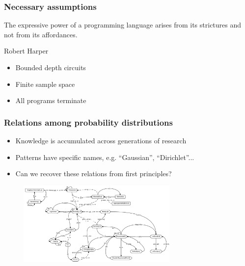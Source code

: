 \documentclass{beamer}
\begin{document}
  \begin{frame}
    \frametitle{Necessary assumptions}
    \setlength{\epigraphwidth}{0.5\textwidth}
    \epigraph{The expressive power of a programming language arises from its strictures and not from its affordances.}{Robert Harper}
    \begin{itemize}
      \item Bounded depth circuits
      \item Finite sample space
      \item All programs terminate
    \end{itemize}
  \end{frame}

  \begin{frame}
    \frametitle{Relations among probability distributions}
    \begin{itemize}
      \item Knowledge is accumulated across generations of research
      \item Patterns have specific names, e.g. ``Gaussian'', ``Dirichlet''...
      \item Can we recover these relations from first principles?
    \end{itemize}
    \begin{figure}[H]
      \centering
      \includegraphics[width=0.7\textwidth]{../clipart/distribution_relations.jpeg}
    \end{figure}
  \end{frame}
\end{document}
